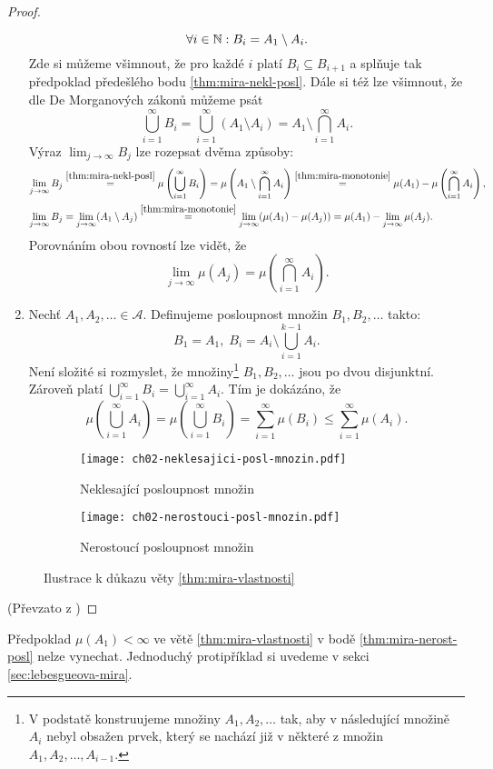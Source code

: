\begin{proof}
\begin{enumerate}[label=\textit{(\roman*)}]
        \[\forall i\in\mathbb{N}: B_i=A_1\setminus A_i.\]
        Zde si můžeme všimnout, že pro každé $i$ platí $B_i\subseteq B_{i+1}$ a splňuje tak předpoklad předešlého bodu \ref{thm:mira-nekl-posl}. Dále si též lze všimnout, že dle De Morganových zákonů můžeme psát
        \[\bigcup_{i=1}^\infty B_i=\bigcup_{i=1}^\infty(A_1\setminus A_i)=A_1\setminus\bigcap_{i=1}^\infty A_i.\]
        Výraz $\lim_{j\to\infty}B_j$ lze rozepsat dvěma způsoby:
        \begin{align*}
            \lim\limits_{j\to\infty}B_j&\stackrel{\ref{thm:mira-nekl-posl}}{=}\mu\left(\bigcup\limits_{i=1}^\infty B_i\right)=\mu\left(A_1\setminus\bigcap\limits_{i=1}^\infty A_i\right)\stackrel{\ref{thm:mira-monotonie}}{=}\mu(A_1)-\mu\left(\bigcap\limits_{i=1}^\infty A_i\right),\\
            \lim\limits_{j\to\infty}B_j&=\lim_{j\to\infty}(A_1\setminus A_j)\stackrel{\ref{thm:mira-monotonie}}{=}\lim_{j\to\infty}(\mu(A_1)-\mu(A_j))=\mu(A_1)-\lim_{j\to\infty}\mu(A_j).
        \end{align*}
        Porovnáním obou rovností lze vidět, že
        \[\lim_{j\to\infty}\mu(A_j)=\mu\left(\bigcap\limits_{i=1}^\infty A_i\right).\]
        \item Nechť $A_1,A_2,\ldots\in\mathcal{A}$. Definujeme posloupnost množin $B_1,B_2,\ldots$ takto:
        \[B_1=A_1,\;B_i=A_i\setminus\bigcup_{i=1}^{k-1} A_i.\]
        Není složité si rozmyslet, že množiny\footnote{V podstatě konstruujeme množiny $A_1,A_2,\ldots$ tak, aby v následující množině $A_i$ nebyl obsažen prvek, který se nachází již v některé z množin $A_1,A_2,\ldots,A_{i-1}$.} $B_1,B_2,\ldots$ jsou po dvou disjunktní. Zároveň platí $\bigcup_{i=1}^\infty B_i=\bigcup_{i=1}^\infty A_i$. Tím je dokázáno, že
        \[\mu\left(\bigcup_{i=1}^\infty A_i\right)=\mu\left(\bigcup_{i=1}^\infty B_i\right)=\sum_{i=1}^{\infty}\mu(B_i)\leqslant\sum_{i=1}^{\infty}\mu(A_i).\]
    \end{enumerate}
    \begin{figure}[h]
        \centering
        \begin{subfigure}{0.45\textwidth}
            \texttt{[image: ch02-neklesajici-posl-mnozin.pdf]}
            \caption{Neklesající posloupnost množin}
            \label{fig:nekl-posl-mnozin}
        \end{subfigure}
        \qquad
        \begin{subfigure}{0.45\textwidth}
            \texttt{[image: ch02-nerostouci-posl-mnozin.pdf]}
            \caption{Nerostoucí posloupnost množin}
            \label{fig:nerost-posl-mnozin}
        \end{subfigure}
        \caption{Ilustrace k důkazu věty \ref{thm:mira-vlastnosti}}
    \end{figure}
    (Převzato z \citep[str. 19]{Netuka2016})
\end{proof}
\begin{remark}
    Předpoklad $\mu(A_1)<\infty$ ve větě \ref{thm:mira-vlastnosti} v bodě \ref{thm:mira-nerost-posl} nelze vynechat. Jednoduchý protipříklad si uvedeme v sekci \ref{sec:lebesgueova-mira}.
\end{remark}